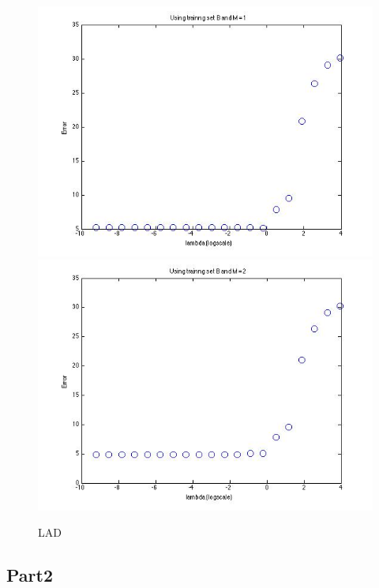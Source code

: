 \begin{figure}[!htb]
                                                                                 \includegraphics[width=\linewidth]{figures/p4_LAD_regressB_m=1}
\endminipage\hfill
{}
  \includegraphics[width=\linewidth]{figures/p4_LAD_regressB_m=2}
\endminipage\hfill
\caption{LAD}
\end{figure}


\subsection{Part2}

